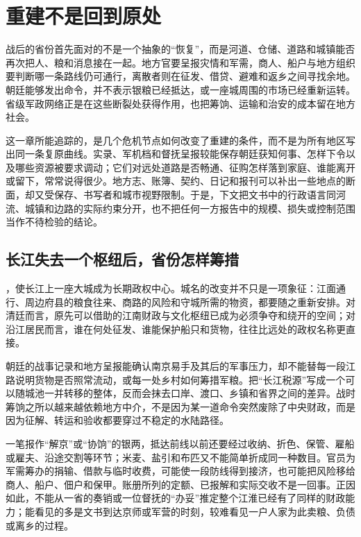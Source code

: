 \section{重建不是回到原处}

战后的省份首先面对的不是一个抽象的“恢复”，而是河道、仓储、道路和城镇能否再次把人、粮和消息接在一起。地方官要呈报灾情和军需，商人、船户与地方组织要判断哪一条路线仍可通行，离散者则在征发、借贷、避难和返乡之间寻找余地。朝廷能够发出命令，并不表示银粮已经抵达，或一座城周围的市场已经重新运转。省级军政网络正是在这些断裂处获得作用，也把筹饷、运输和治安的成本留在地方社会。

这一章所能追踪的，是几个危机节点如何改变了重建的条件，而不是为所有地区写出同一条复原曲线。实录、军机档和督抚呈报较能保存朝廷获知何事、怎样下令以及哪些资源被要求调动；它们对远处道路是否畅通、征购怎样落到家庭、谁能离开或留下，常常说得很少。地方志、账簿、契约、日记和报刊可以补出一些地点的断面，却又受保存、书写者和城市视野限制。于是，下文把文书中的行政语言同河流、城镇和边路的实际约束分开，也不把任何一方报告中的规模、损失或控制范围当作不待检验的结论。

\subsection{长江失去一个枢纽后，省份怎样筹措}

，使长江上一座大城成为长期政权中心。城名的改变并不只是一项象征：江面通行、周边府县的粮食往来、商路的风险和守城所需的物资，都要随之重新安排。对清廷而言，原先可以借助的江南财政与文化枢纽已成为必须争夺和绕开的空间；对沿江居民而言，谁在何处征发、谁能保护船只和货物，往往比远处的政权名称更直接。

朝廷的战事记录和地方呈报能确认南京易手及其后的军事压力，却不能替每一段江路说明货物是否照常流动，或每一处乡村如何筹措军粮。把“长江税源”写成一个可以随城池一并转移的整体，反而会抹去口岸、渡口、乡镇和省界之间的差异。战时筹饷之所以越来越依赖地方中介，不是因为某一道命令突然废除了中央财政，而是因为征解、转运和验收都要穿过不稳定的水陆路径。

一笔报作“解京”或“协饷”的银两，抵达前线以前还要经过收纳、折色、保管、雇船或雇夫、沿途交割等环节；米麦、盐引和布匹又不能简单折成同一种数目。官员为军需筹办的捐输、借款与临时收费，可能使一段防线得到接济，也可能把风险移给商人、船户、佃户和保甲。账册所列的定额、已报解和实际交收不是一回事。正因如此，不能从一省的奏销或一位督抚的“办妥”推定整个江淮已经有了同样的财政能力；能看见的多是文书到达京师或军营的时刻，较难看见一户人家为此卖粮、负债或离乡的过程。

